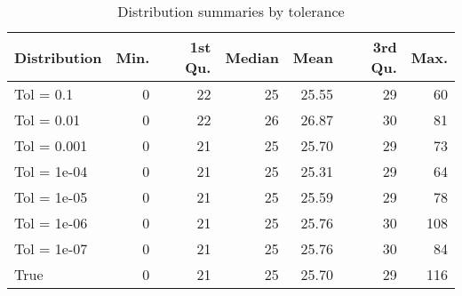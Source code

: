 \begin{center}
\begin{table} 
\begin{tabular}{lrrrrrr}
 Distribution & Min. & 1st Qu. & Median & Mean & 3rd Qu. & Max. \\ 
  \hline
\hline
Tol =  0.1 & 0 & 22 & 25 & 25.55 & 29 & 60 \\ 
  Tol =  0.01 & 0 & 22 & 26 & 26.87 & 30 & 81 \\ 
  Tol =  0.001 & 0 & 21 & 25 & 25.70 & 29 & 73 \\ 
  Tol =  1e-04 & 0 & 21 & 25 & 25.31 & 29 & 64 \\ 
  Tol =  1e-05 & 0 & 21 & 25 & 25.59 & 29 & 78 \\ 
  Tol =  1e-06 & 0 & 21 & 25 & 25.76 & 30 & 108 \\ 
  Tol =  1e-07 & 0 & 21 & 25 & 25.76 & 30 & 84 \\ 
  True & 0 & 21 & 25 & 25.70 & 29 & 116 \\ 
  \end{tabular}
  \caption{Distribution summaries by tolerance}
\label{tab:SummaryTable}
\end{table} 
\end{center}
